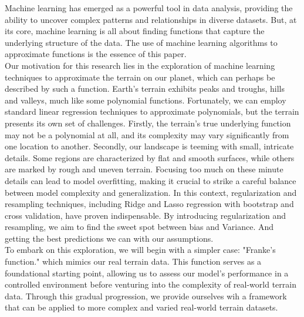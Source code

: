 \documentclass[twoside,11pt]{report}
\begin{document}
Machine learning has emerged as a powerful tool in data analysis, providing the ability to uncover complex 
patterns and relationships in diverse datasets. But, at its core, machine learning is all about finding 
functions that capture the underlying structure of the data. The use of machine learning algorithms 
to approximate functions is the essence of this paper.\\

Our motivation for this research lies in the exploration of machine learning techniques to approximate 
the terrain on our planet, which can perhaps be described by such a function. Earth's terrain exhibits 
peaks and troughs, hills and valleys, much like some polynomial functions. Fortunately, we can employ 
standard linear regression techniques to approximate polynomials, but the terrain presents its own set 
of challenges. Firstly, the terrain's true underlying function may not be a polynomial at all, and its complexity may 
vary significantly from one location to another. Secondly, our landscape is teeming with small, intricate 
details. Some regions are characterized by flat and smooth surfaces, while others are marked by rough and 
uneven terrain. Focusing too much on these minute details can lead to model overfitting, making it crucial 
to strike a careful balance between model complexity and generalization.
In this context, regularization and resampling techniques, including Ridge and Lasso regression with bootstrap
and cross validation, have proven indispensable. By introducing regularization and resampling, we aim to find 
the sweet spot between bias and Variance. And getting the best predictions we can with our assumptions.\\
To embark on this exploration, we will begin with a simpler case: "Franke's function." which mimics our real terrain
data. This function 
serves as a foundational starting point, allowing us to assess our model's performance in a controlled 
environment before venturing into the complexity of real-world terrain data. Through this gradual progression, 
we provide ourselves wih a framework that can be applied to more complex and varied real-world terrain datasets.\\
\end{document}
